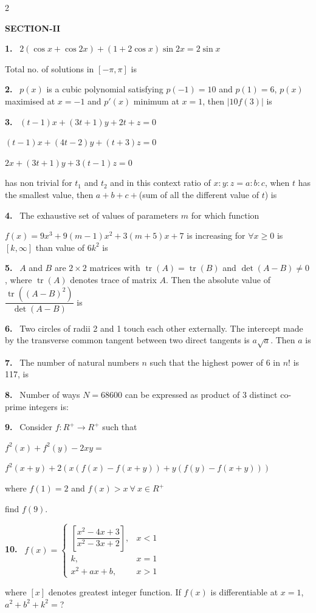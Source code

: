 \documentclass[10pt]{extarticle}
\newcommand{\sect}[1]{\par\smallskip\noindent\textbf{#1}\par}
\newcommand{\qn}[1]{\par\smallskip\noindent\textbf{#1.}~}
\begin{document}
\begin{multicols}{2}
\sect{SECTION-II}
\qn{1} $2(\cos x+\cos2x)+(1+2\cos x)\sin2x=2\sin x$

Total no. of solutions in $[-\pi,\pi]$ is

\qn{2} $p(x)$ is a cubic polynomial satisfying $p(-1)=10$ and $p(1)=6$, $p(x)$ maximised at $x=-1$ and $p'(x)$ minimum at $x=1$, then $|10f(3)|$ is

\qn{3} $(t-1)x+(3t+1)y+2t+z=0$

$(t-1)x+(4t-2)y+(t+3)z=0$

$2x+(3t+1)y+3(t-1)z=0$

has non trivial for $t_1$ and $t_2$ and in this context ratio of $x:y:z=a:b:c$, when $t$ has the smallest value, then $a+b+c+$(sum of all the different value of $t$) is

\qn{4} The exhaustive set of values of parameters $m$ for which function

$f(x)=9x^3+9(m-1)x^2+3(m+5)x+7$ is increasing for $\forall x\ge0$ is $[k,\infty]$ than value of $6k^2$ is

\qn{5} $A$ and $B$ are $2\times2$ matrices with $\operatorname{tr}(A)=\operatorname{tr}(B)$ and $\det(A-B)\ne0$, where $\operatorname{tr}(A)$ denotes trace of matrix $A$. Then the absolute value of $\dfrac{\operatorname{tr}\left((A-B)^2\right)}{\det(A-B)}$ is

\qn{6} Two circles of radii 2 and 1 touch each other externally. The intercept made by the transverse common tangent between two direct tangents is $a\sqrt a$. Then $a$ is

\qn{7} The number of natural numbers $n$ such that the highest power of 6 in $n!$ is 117, is

\qn{8} Number of ways $N=68600$ can be expressed as product of 3 distinct co-prime integers is:

\qn{9} Consider $f:R^+\to R^+$ such that

$f^2(x)+f^2(y)-2xy=$

$f^2(x+y)+2(x(f(x)-f(x+y))+y(f(y)-f(x+y)))$

where $f(1)=2$ and $f(x)>x\ \forall\ x\in R^+$

find $f(9)$.

\qn{10} $f(x)=\begin{cases}\left[\dfrac{x^2-4x+3}{x^2-3x+2}\right], & x<1\\ k, & x=1\\ x^2+ax+b, & x>1\end{cases}$

where $[x]$ denotes greatest integer function. If $f(x)$ is differentiable at $x=1$, $a^2+b^2+k^2=$?

\end{multicols}
\end{document}
